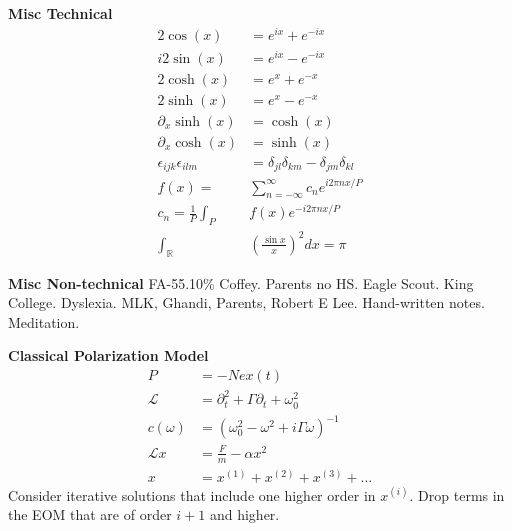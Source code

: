 \documentclass[12pt]{article}
\begin{document}
\begin{multicols}{3}
\textbf{Misc Technical}
\begin{align}
  2\cos(x) &= e^{ix} + e^{-ix}\\
  i2\sin(x) &= e^{ix} - e^{-ix}\\
  2\cosh(x) &= e^x + e^{-x}\\
  2\sinh(x) &= e^x - e^{-x}\\
  \partial_x \sinh(x) &= \cosh(x)\\
  \partial_x \cosh(x) &= \sinh(x)\\
  \epsilon_{ijk} \epsilon_{ilm} &= \delta_{jl} \delta_{km} - \delta_{jm} \delta_{kl}\\
  f(x) = &\sum_{n = -\infty}^{\infty} c_n e^{i2\pi n x / P}\\
  c_n = \frac{1}{P} \int_{P} &f(x) e^{-i2\pi n x / P}\\
  \int_{\mathbb{R}} &(\frac{\sin x}{x})^2dx = \pi
\end{align}

\textbf{Misc Non-technical}
FA-55.10\% Coffey. Parents no HS. Eagle Scout. King College. Dyslexia.
MLK, Ghandi, Parents, Robert E Lee. Hand-written notes. Meditation.

\textbf{Classical Polarization Model}
\begin{align}
P &= -Nex(t)\\
\mathcal{L} &= \partial_t^2 + \Gamma\partial_t + \omega_0^2\\
c(\omega) &= (\omega_0^2 - \omega^2 + i\Gamma\omega)^{-1}\\
\mathcal{L}x &= \frac{F}{m} - \alpha x^2\\
x &= x^{(1)} + x^{(2)} + x^{(3)} + \dots
\end{align}
Consider iterative solutions that include one higher order in $x^{(i)}$. Drop terms in the
EOM that are of order $i + 1$ and higher.

\end{multicols}

\pagebreak
\end{document}
